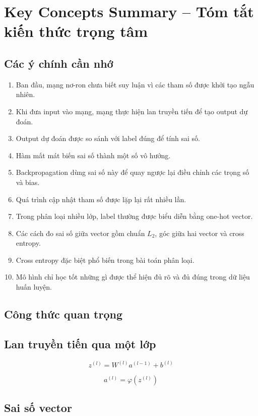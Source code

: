 \section{Key Concepts Summary -- Tóm tắt kiến thức trọng tâm}

\subsection{Các ý chính cần nhớ}

\begin{enumerate}
    \item Ban đầu, mạng nơ-ron chưa biết suy luận vì các tham số được khởi tạo ngẫu nhiên.
    \item Khi đưa input vào mạng, mạng thực hiện lan truyền tiến để tạo output dự đoán.
    \item Output dự đoán được so sánh với label đúng để tính sai số.
    \item Hàm mất mát biến sai số thành một số vô hướng.
    \item Backpropagation dùng sai số này để quay ngược lại điều chỉnh các trọng số và bias.
    \item Quá trình cập nhật tham số được lặp lại rất nhiều lần.
    \item Trong phân loại nhiều lớp, label thường được biểu diễn bằng one-hot vector.
    \item Các cách đo sai số giữa vector gồm chuẩn $L_2$, góc giữa hai vector và cross entropy.
    \item Cross entropy đặc biệt phổ biến trong bài toán phân loại.
    \item Mô hình chỉ học tốt những gì được thể hiện đủ rõ và đủ đúng trong dữ liệu huấn luyện.
\end{enumerate}

\subsection{Công thức quan trọng}

\subsection*{Lan truyền tiến qua một lớp}

\[
    z^{(l)} = W^{(l)}a^{(l-1)} + b^{(l)}
\]

\[
    a^{(l)} = \varphi(z^{(l)})
\]

\subsection*{Sai số vector}

